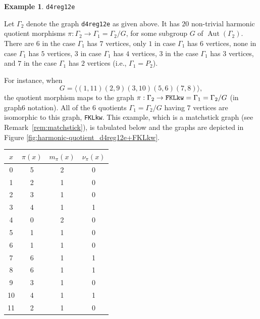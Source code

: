 \documentclass[12pt,letterpaper]{article}
\theoremstyle{definition}
\newtheorem{example}[theorem]{Example}
\DeclareMathOperator{\Aut}{Aut}
\begin{document}
\begin{example}%
\label{example:d4reg12e}
 {\tt d4reg12e}\newline
{\rm  
  Let $\Gamma_2$ denote the graph {\tt d4reg12e} as given above.
It has $20$  non-trivial harmonic quotient morphisms
$\pi: \Gamma_2\to \Gamma_1=\Gamma_2/G$,
for some subgroup $G$ of $\Aut(\Gamma_2)$.
There are $6$ in the case $\Gamma_1$ has $7$ vertices,
only $1$ in case $\Gamma_1$ has $6$ vertices,
none in case $\Gamma_1$ has $5$ vertices,
$3$ in case $\Gamma_1$ has $4$ vertices,
$3$ in the case $\Gamma_1$ has $3$ vertices,
and  $7$ in the case $\Gamma_1$ has $2$ vertices
(i.e., $\Gamma_1=P_2$).

For instance, when
\[
G = \langle  (1,11)(2,9)(3,10)(5,6)(7,8) \rangle ,
\]
the quotient morphism maps to the graph
$\pi: \Gamma_2\to {\tt FKLkw}=\Gamma_1=\Gamma_2/G $ (in graph6 notation).
All of the $6$ quotients $\Gamma_1=\Gamma_2/G$ having $7$ vertices
are isomorphic to this graph, {\tt FKLkw}.
This example, which is a matchstick graph (see Remark~\ref{rem:matchstick}),
is tabulated below and the graphs are depicted in
Figure \ref{fig:harmonic-quotient_d4reg12e+FKLkw}.

\begin{center}
\begin{tabular}{c|c|c|c}  
  $x$ & $\pi(x)$ & $m_\pi(x)$ & $\nu_\pi(x)$   \\ \hline
  0   &    5   &        2         &  0  \\ 
  1   &    2   &        1         &  0  \\ 
  2   &    3   &        1         &  0  \\ 
  3   &    4   &        1         &  1   \\
  4   &    0   &        2         &  0   \\
  5   &    1   &        1         &  0   \\
  6   &    1   &        1         &  0   \\
  7   &    6   &        1         &  1   \\
  8   &    6   &        1         &  1   \\
  9   &    3   &        1         &  0  \\   
  10  &    4  &         1         &  1  \\
  11  &    2   &        1         &  0  \\  
\end{tabular}
\end{center}

}
\end{example}
\end{document}
